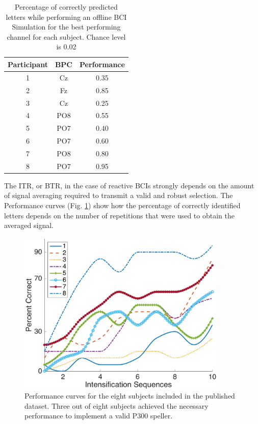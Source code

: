 \documentclass[entropy,article,submit,moreauthors,pdftex,10pt,a4paper]{mdpi}
\begin{document}
\begin{table}[H]
\caption{Percentage of correctly predicted letters while performing an offline BCI Simulation for the best performing channel for each subject. Chance level is 0.02 }
\centering
\begin{tabular}{ccc}
\toprule
\textbf{Participant}	&  \textbf{BPC}	& \textbf{Performance}\\
\midrule
1     &     Cz   &   0.35  \\
2     &     Fz   &   0.85  \\
3     &     Cz   &   0.25  \\
4     &     PO8 &   0.55  \\
5     &     PO7 &   0.40 \\
6     &     PO7 &   0.60  \\
7     &     PO8 &   0.80  \\
8     &     PO7 &   0.95 \\

\bottomrule
\end{tabular}
\label{tab:results}
\end{table}

The ITR, or BTR, in the case of reactive BCIs \citep{WolpawJonathanR2012} strongly depends on the amount of signal averaging required to transmit a valid and robust selection.  The Performance curves (Fig. \ref{fig:performance}) show how the percentage of correctly identified letters depends on the number of repetitions that were used to obtain the averaged signal.

\begin{figure}[H]
\centering
\includegraphics[width=10cm]{performance.eps}
\caption{Performance curves for the eight subjects included in the published dataset.  Three out of eight subjects achieved the necessary performance to implement a valid P300 speller.}
\label{fig:performance}
\end{figure}
\end{document}

